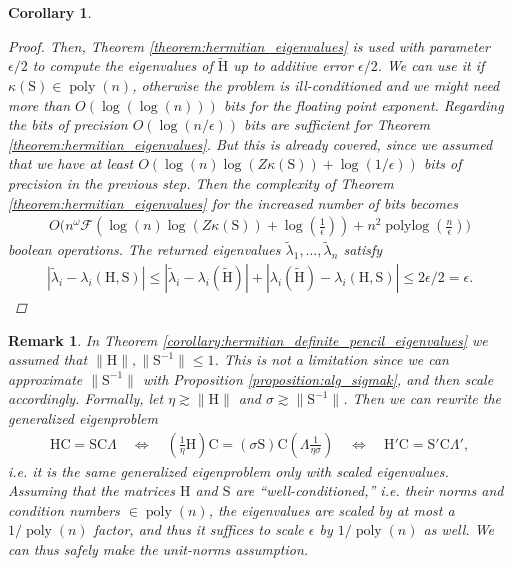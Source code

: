 \documentclass{article}
\newcommand{\labs}{\left|}
\newcommand{\rabs}{\right|}
\newtheorem{corollary}{Corollary}[section]
\newtheorem{remark}{Remark}[section]
\DeclareMathOperator{\poly}{poly}
\DeclareMathOperator{\polylog}{polylog}
\newcommand\matC{\boldsymbol{\mathrm{C}}}
\newcommand\matH{\boldsymbol{\mathrm{H}}}
\newcommand\matS{\boldsymbol{\mathrm{S}}}
\newcommand\matHtilde{\widetilde{\boldsymbol{\mathrm{H}}}}
\newcommand{\matmulexponent}{\omega}
\newcommand{\flopcost}{\mathcal{F}}
\newcommand{\geneigmatrix}{\Lambda}
\begin{document}
\begin{corollary}
\begin{proof}
         Then, Theorem \ref{theorem:hermitian_eigenvalues} is used with parameter $\epsilon/2$ to compute the eigenvalues of $\matHtilde$ up to additive error $\epsilon/2$. We can use it if $\kappa(\matS)\in\poly(n)$, otherwise the problem is ill-conditioned and we might need more than $O(\log(\log(n)))$ bits for the floating point exponent. Regarding the bits of precision $O(\log(n/\epsilon))$ bits are sufficient for Theorem \ref{theorem:hermitian_eigenvalues}. But this is already covered, since we assumed that we have at least $O(\log(n)\log(Z\kappa(\matS))+\log(1/\epsilon))$ bits of precision in the previous step. Then the complexity of Theorem \ref{theorem:hermitian_eigenvalues} for the increased number of bits becomes
         \begin{align*}
             O\Big(
                n^\matmulexponent
                \flopcost\left(
                \log(n)\log(Z\kappa(\matS))+\log(\tfrac{1}{\epsilon})
                \right)
                +
                n^2\polylog(\tfrac{n}{\epsilon})
            \Big)
         \end{align*}
         boolean operations. The returned eigenvalues $\widetilde\lambda_1,\ldots,\widetilde\lambda_n$ satisfy
         \begin{align*}
             \labs \widetilde\lambda_i-\lambda_i(\matH,\matS) \rabs
             \leq 
             \labs \widetilde\lambda_i-\lambda_i(\matHtilde) \rabs
             +
             \labs \lambda_i(\matHtilde) -\lambda_i(\matH,\matS)\rabs
             \leq 2\epsilon/2 = \epsilon.
         \end{align*}
    \end{proof}
\end{corollary}
\begin{remark}
    In Theorem \ref{corollary:hermitian_definite_pencil_eigenvalues} we assumed that $\|\matH\|,\|\matS^{-1}\|\leq 1$. This is not a limitation since we can approximate $\|\matS^{-1}\|$ with Proposition \ref{proposition:alg_sigmak}, and then scale accordingly. Formally, let $\eta \gtrsim \|\matH\|$ and $\sigma\gtrsim \|\matS^{-1}\|$. Then we can rewrite the generalized eigenproblem
\begin{align*}
\matH\matC=\matS\matC\geneigmatrix
\quad
\Leftrightarrow
\quad
(\tfrac{1}{\eta}\matH)\matC = (\sigma\matS) \matC (\geneigmatrix\tfrac{1}{\eta\sigma})
\quad
\Leftrightarrow
\quad
\matH'\matC = \matS'\matC\geneigmatrix',     
\end{align*}
i.e. it is the same generalized eigenproblem only with scaled eigenvalues. Assuming that the matrices $\matH$ and $\matS$ are ``well-conditioned,'' i.e. their norms and condition numbers $\in \poly(n)$, the eigenvalues are scaled by at most a $1/\poly(n)$ factor, and thus it suffices to scale $\epsilon$ by $1/\poly(n)$ as well. We can thus safely make the unit-norms assumption. 
\end{remark}
\end{document}
